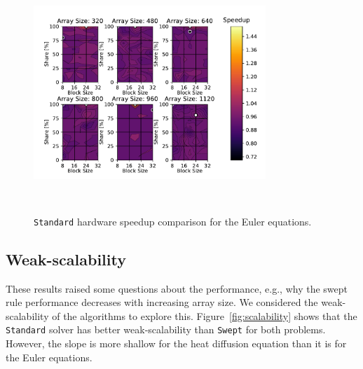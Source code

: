 \documentclass[preprints,article,accept,moreauthors,pdftex]{Definitions/mdpi}
\def\Swept{\texttt{Swept}}
\def\Standard{\texttt{Standard}}
\begin{document}
\begin{figure}[H]
    
    \begin{center}
        \includegraphics[height=9cm,width=0.78\textwidth, trim={0.75cm 0.4cm 0.8cm 0.7cm},clip]{figs/hardwareStandardSpeedUpeuler.pdf}
        \caption{\Standard{} hardware speedup comparison for the Euler equations.}
        \label{fig:eulerHardwareCompStd}
    \end{center}
\end{figure}


\subsection{Weak-scalability}
These results raised some questions about the performance, e.g., why the swept rule performance decreases with increasing array size. We considered the weak-scalability of the algorithms to explore this. Figure~\ref{fig:scalability} shows that the \Standard{} solver has better weak-scalability than \Swept{} for both problems. However, the slope is more shallow for the heat diffusion equation than it is for the Euler equations. 
\end{document}
